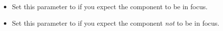 \begin{itemize}
\item Set this parameter to \gdrefbooleantrue{} if you expect the component to be in focus.
\item Set this parameter to \gdrefbooleanfalse{} if you expect the component \emph{not} to be in focus.
\end{itemize}

